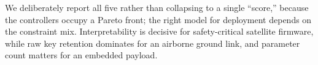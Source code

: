 We deliberately report all five rather than collapsing to a single ``score,'' because the controllers occupy a Pareto front; the right model for deployment depends on the constraint mix. Interpretability is decisive for safety-critical satellite firmware, while raw key retention dominates for an airborne ground link, and parameter count matters for an embedded payload.
